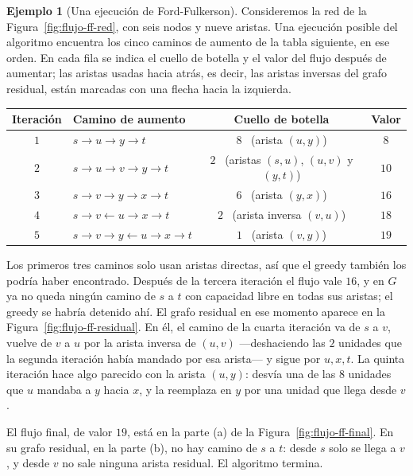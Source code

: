 \documentclass[12pt, spanish, oneside, openany]{book}
\theoremstyle{uprightplain}
\theoremstyle{definition}
\newtheorem{ejemplo}[teorema]{Ejemplo}
\theoremstyle{remark}
\theoremstyle{definition}
\begin{document}
\begin{ejemplo}[Una ejecución de Ford-Fulkerson]
\label{ej:flujo-ff-ejecucion}
Consideremos la red de la Figura~\ref{fig:flujo-ff-red}, con seis nodos y nueve aristas. Una ejecución posible del algoritmo encuentra los cinco caminos de aumento de la tabla siguiente, en ese orden. En cada fila se indica el cuello de botella y el valor del flujo después de aumentar; las aristas usadas hacia atrás, es decir, las aristas inversas del grafo residual, están marcadas con una flecha hacia la izquierda.
\begin{center}
\small
\renewcommand{\arraystretch}{1.2}
\begin{tabular}{@{}clcc@{}}
\toprule
\textbf{Iteración} & \textbf{Camino de aumento} & \textbf{Cuello de botella} & \textbf{Valor}\\
\midrule
$1$ & $s\to u\to y\to t$ & $8$ \ (arista $(u,y)$) & $8$\\
$2$ & $s\to u\to v\to y\to t$ & $2$ \ (aristas $(s,u)$, $(u,v)$ y $(y,t)$) & $10$\\
$3$ & $s\to v\to y\to x\to t$ & $6$ \ (arista $(y,x)$) & $16$\\
$4$ & $s\to v\leftarrow u\to x\to t$ & $2$ \ (arista inversa $(v,u)$) & $18$\\
$5$ & $s\to v\to y\leftarrow u\to x\to t$ & $1$ \ (arista $(v,y)$) & $19$\\
\bottomrule
\end{tabular}
\end{center}
Los primeros tres caminos solo usan aristas directas, así que el greedy también los podría haber encontrado. Después de la tercera iteración el flujo vale $16$, y en $G$ ya no queda ningún camino de $s$ a $t$ con capacidad libre en todas sus aristas; el greedy se habría detenido ahí. El grafo residual en ese momento aparece en la Figura~\ref{fig:flujo-ff-residual}. En él, el camino de la cuarta iteración va de $s$ a $v$, vuelve de $v$ a $u$ por la arista inversa de $(u,v)$ ---deshaciendo las $2$ unidades que la segunda iteración había mandado por esa arista--- y sigue por $u,x,t$. La quinta iteración hace algo parecido con la arista $(u,y)$: desvía una de las $8$ unidades que $u$ mandaba a $y$ hacia $x$, y la reemplaza en $y$ por una unidad que llega desde $v$.

El flujo final, de valor $19$, está en la parte (a) de la Figura~\ref{fig:flujo-ff-final}. En su grafo residual, en la parte (b), no hay camino de $s$ a $t$: desde $s$ solo se llega a $v$, y desde $v$ no sale ninguna arista residual. El algoritmo termina.
\end{ejemplo}
\end{document}
